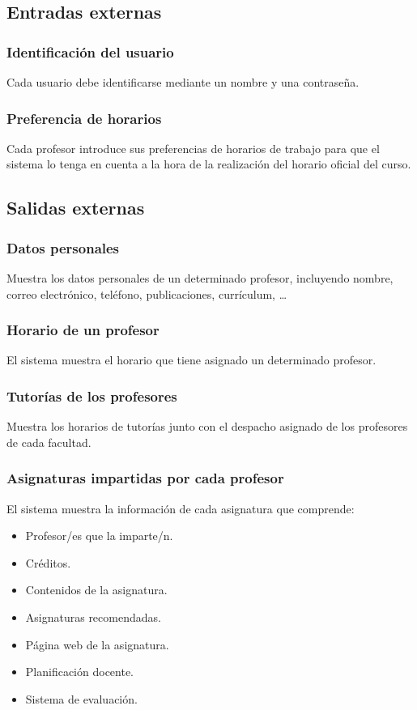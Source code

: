 \documentclass[11pt,a4paper,spanish,twoside]{book}
\begin{document}
\subsection{Entradas externas}
\subsubsection{Identificación del usuario}
Cada usuario debe identificarse mediante un nombre y una contraseña.

\subsubsection{Preferencia de horarios} 
Cada profesor introduce sus preferencias de horarios de trabajo para que el
sistema lo tenga en cuenta a la hora de la realización del horario oficial
del curso.

\subsection{Salidas externas}
\subsubsection{Datos personales}
Muestra los datos personales de un determinado profesor, incluyendo
nombre, correo electrónico, teléfono, publicaciones, currículum, \dots

\subsubsection{Horario de un profesor}
El sistema muestra el horario que tiene asignado un determinado profesor.

\subsubsection{Tutorías de los profesores} 
Muestra los horarios de tutorías junto con el despacho asignado de los
profesores de cada facultad.
 
\subsubsection{Asignaturas impartidas por cada profesor}
El sistema muestra la información de cada asignatura que comprende:
\begin{itemize}
\item Profesor/es que la imparte/n.
\item Créditos.
\item Contenidos de la asignatura.
\item Asignaturas recomendadas.
\item Página web de la asignatura.
\item Planificación docente.
\item Sistema de evaluación.
\end{itemize}
\end{document}
